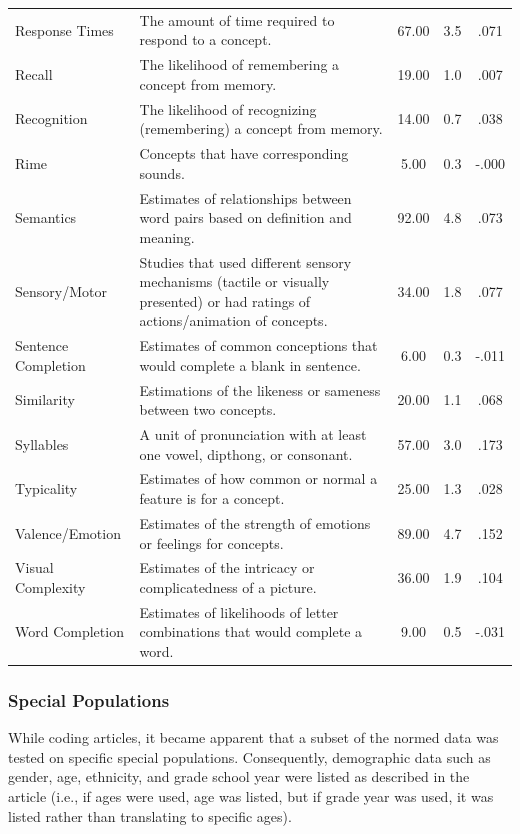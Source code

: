 \documentclass[english,man]{apa6}
\theoremstyle{definition}
\theoremstyle{definition}
\theoremstyle{definition}
\theoremstyle{remark}
\begin{document}
\begin{table}[tbp]
\begin{center}
\begin{threeparttable}
\begin{tabular}{llccc}
Response Times & The amount of time required to respond to a concept. & 67.00 & 3.5 & .071\\
Recall & The likelihood of remembering a concept from memory. & 19.00 & 1.0 & .007\\
Recognition & The likelihood of recognizing (remembering) a concept from memory. & 14.00 & 0.7 & .038\\
Rime & Concepts that have corresponding sounds. & 5.00 & 0.3 & -.000\\
Semantics & Estimates of relationships between word pairs based on definition and meaning. & 92.00 & 4.8 & .073\\
Sensory/Motor & Studies that used different sensory mechanisms (tactile or visually presented) or had ratings of actions/animation of concepts. & 34.00 & 1.8 & .077\\
Sentence Completion & Estimates of common conceptions that would complete a blank in sentence. & 6.00 & 0.3 & -.011\\
Similarity & Estimations of the likeness or sameness between two concepts. & 20.00 & 1.1 & .068\\
Syllables & A unit of pronunciation with at least one vowel, dipthong, or consonant. & 57.00 & 3.0 & .173\\
Typicality & Estimates of how common or normal a feature is for a concept. & 25.00 & 1.3 & .028\\
Valence/Emotion & Estimates of the strength of emotions or feelings for concepts. & 89.00 & 4.7 & .152\\
Visual Complexity & Estimates of the intricacy or complicatedness of a picture. & 36.00 & 1.9 & .104\\
Word Completion & Estimates of likelihoods of letter combinations that would complete a word. & 9.00 & 0.5 & -.031\\
\bottomrule
\end{tabular}
\end{threeparttable}
\end{center}
\end{table}

\subsubsection{Special Populations}\label{special-populations}

While coding articles, it became apparent that a subset of the normed
data was tested on specific special populations. Consequently,
demographic data such as gender, age, ethnicity, and grade school year
were listed as described in the article (i.e., if ages were used, age
was listed, but if grade year was used, it was listed rather than
translating to specific ages).
\end{document}
